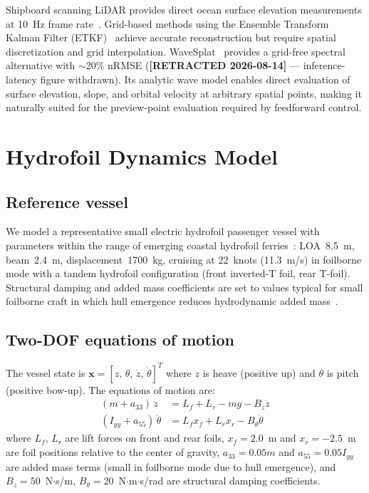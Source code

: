 \documentclass[review]{elsarticle}
\begin{document}
Shipboard scanning LiDAR provides direct ocean surface elevation
measurements at 10~Hz frame rate~\citep{nouguier2014, collins2022}.
Grid-based methods using the Ensemble Transform Kalman Filter
(ETKF)~\citep{huhn2022, desmars2020} achieve accurate
reconstruction but require spatial discretization and grid interpolation.
WaveSplat~\citep{park2026wavesplat} provides a grid-free spectral
alternative with $\sim$20\% nRMSE
(\textbf{[RETRACTED 2026-08-14]} --- inference-latency figure withdrawn).
Its analytic wave model enables direct evaluation of surface
elevation, slope, and orbital velocity at arbitrary spatial points,
making it naturally suited for the preview-point evaluation required
by feedforward control.

\section{Hydrofoil Dynamics Model}
\label{sec:dynamics}

\subsection{Reference vessel}

We model a representative small electric hydrofoil passenger
vessel with parameters within the range of emerging coastal
hydrofoil ferries~\citep{faltinsen2005}:
LOA~8.5~m, beam~2.4~m, displacement~1700~kg, cruising at
22~knots (11.3~m/s) in foilborne mode with a tandem hydrofoil
configuration (front inverted-T foil, rear T-foil).
Structural damping and added mass coefficients are set to
values typical for small foilborne craft in which hull
emergence reduces hydrodynamic added mass~\citep{faltinsen2005}.

\subsection{Two-DOF equations of motion}

The vessel state is $\mathbf{x} = [z,\, \theta,\, \dot{z},\, \dot{\theta}]^T$
where $z$ is heave (positive up) and $\theta$ is pitch (positive bow-up).
The equations of motion are:
\begin{align}
  (m + a_{33})\,\ddot{z} &= L_f + L_r - mg - B_z \dot{z}
  \label{eq:heave} \\
  (I_{yy} + a_{55})\,\ddot{\theta} &= L_f x_f + L_r x_r - B_\theta \dot{\theta}
  \label{eq:pitch}
\end{align}
where $L_f$, $L_r$ are lift forces on front and rear foils,
$x_f = 2.0$~m and $x_r = -2.5$~m are foil positions relative to
the center of gravity, $a_{33} = 0.05m$ and $a_{55} = 0.05 I_{yy}$
are added mass terms (small in foilborne mode due to hull emergence),
and $B_z = 50$~N$\cdot$s/m, $B_\theta = 20$~N$\cdot$m$\cdot$s/rad
are structural damping coefficients.
\end{document}
